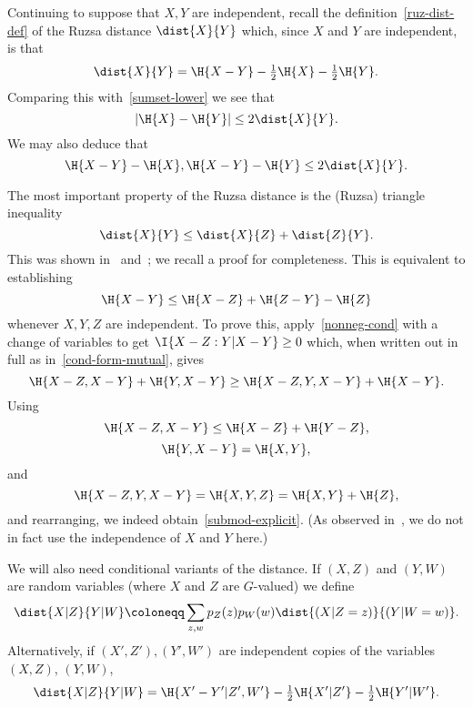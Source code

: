 Continuing to suppose that $X, Y$ are independent, recall the definition~\eqref{ruz-dist-def} of the Ruzsa distance $\dist{X}{Y}$ which, since $X$ and $Y$ are independent, is that
\[
  \dist{X}{Y} = \H{X - Y} - \tfrac{1}{2} \H{X} - \tfrac{1}{2} \H{Y}.
\]
Comparing this with~\eqref{sumset-lower} we see that
\begin{equation}
  \label{ruzsa-diff}
  |\H{X}-\H{Y}| \leq 2\dist{X}{Y}.
\end{equation}
We may also deduce that
\[
  \H{X-Y} - \H{X}, \H{X-Y} - \H{Y} \leq 2\dist{X}{Y}.
\]

The most important property of the Ruzsa distance is the (Ruzsa) triangle inequality
\[ \dist{X}{Y} \leq \dist{X}{Z} + \dist{Z}{Y}.\]
This was shown in~\cite{ruzsa-entropy} and~\cite[(16)]{tao-entropy}; we recall a proof for completeness.
This is equivalent to establishing
\begin{equation}\label{submod-explicit} \H{X - Y} \leq \H{X-Z} + \H{Z-Y} - \H{Z}\end{equation}
whenever $X, Y, Z$ are independent. To prove this, apply~\eqref{nonneg-cond} with a change of variables to get $\I{X-Z : Y | X - Y} \geq 0$ which, when written out in full as in~\eqref{cond-form-mutual}, gives
\[ \H{X - Z, X - Y} + \H{Y, X - Y} \geq \H{X - Z, Y, X - Y} + \H{X - Y}.\]
Using
\[ \H{X - Z, X - Y} \leq \H{X - Z} + \H{Y - Z},\]
\[ \H{Y, X - Y} = \H{X, Y}, \] and
\[ \H{X - Z, Y, X - Y} = \H{X, Y, Z} = \H{X, Y} + \H{Z},\] and rearranging, we indeed obtain~\eqref{submod-explicit}. (As observed in~\cite{gmt}, we do not in fact use the independence of $X$ and $Y$ here.)


We will also need conditional variants of the distance.
If $(X, Z)$ and $(Y, W)$ are random variables (where $X$ and $Z$ are $G$-valued) we define
\begin{equation} \dist{X  | Z}{Y | W}   \coloneqq \sum_{z,w} p_{Z}(z) p_{W}(w) \dist{(X| Z=z)}{(Y| W = w )}.\label{cond-dist-def}
\end{equation}
Alternatively, if $(X',Z'), (Y',W')$ are independent copies of the variables $(X,Z)$, $(Y,W)$,
\begin{equation}\label{cond-dist-alt} \dist{X  | Z}{Y | W} = \H{X'-Y'|Z',W'} - \tfrac{1}{2} \H{X'|Z'} - \tfrac{1}{2}\H{Y'|W'} .\end{equation}

